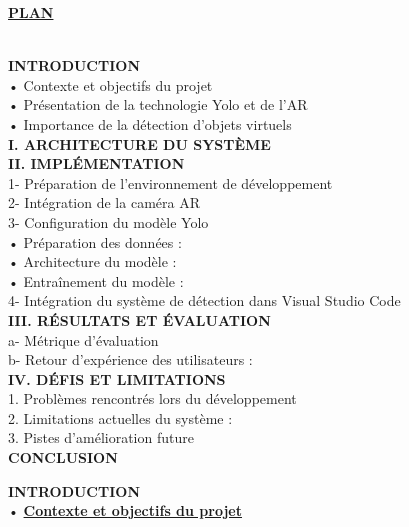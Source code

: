 \documentclass[a4paper, 13px]{article}
\begin{document}
\Large {\bfseries \underline{PLAN}}\\
\\
\begin{framed}
{\bfseries  INTRODUCTION}                                        \\
•	Contexte et objectifs du projet	                \\
•	Présentation de la technologie Yolo et de l'AR	\\
•	Importance de la détection d'objets virtuels	     \\
{\bfseries \MakeUppercase{I. Architecture du système  }}	                        \\
{\bfseries \MakeUppercase{II. Implémentation}}                                 \\
1-	Préparation de l'environnement de développement	\\
2-	Intégration de la caméra AR	                     \\
3-	Configuration du modèle Yolo	                     \\
•	Préparation des données :	                     \\
•	Architecture du modèle :	                         \\
•	Entraînement du modèle :	                         \\
4-	Intégration du système de détection dans Visual Studio Code	\\
{\bfseries \MakeUppercase{III. Résultats et évaluation}}	                         \\
a-	Métrique d’évaluation	                         \\
b-	Retour d'expérience des utilisateurs :	        \\
{\bfseries \MakeUppercase{ IV. Défis et limitations}}                          	\\
1.	Problèmes rencontrés lors du développement	    \\
2.	Limitations actuelles du système :	            \\
3.	Pistes d'amélioration future	                    \\
{\bfseries \MakeUppercase{Conclusion}}
\end{framed}



\newpage

{\bfseries  INTRODUCTION}\\

•	{\bfseries \underline{Contexte et objectifs du projet}}\\
\end{document}
